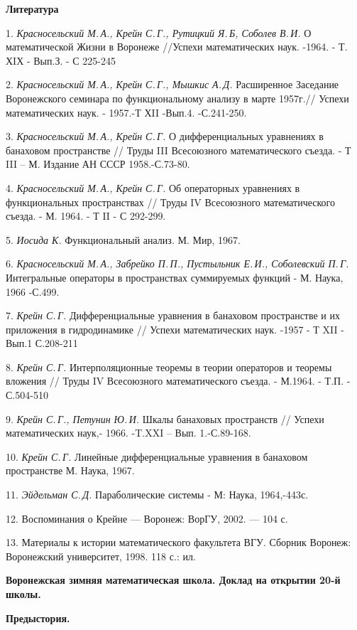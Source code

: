 \smallskip \centerline{\bf Литература}\nopagebreak

1. {\it Красносельский М.\,А., Крейн С.\,Г., Рутицкий Я.\,Б, Соболев В.\,И.} О математической Жизни в Воронеже //Успехи математических наук. -1964. - Т. ХIХ - Вып.З. - С 225-245

2.	{\it Красносельский М.\,А., Крейн С.\,Г., Мышкис А.\,Д.} Расширенное Заседание Воронежского семинара по функциональному анализу в марте 1957г.// Успехи математических наук. - 1957.-Т ХII -Вып.4. -С.241-250.

3. {\it Красносельский М.\,А., Крейн С.\,Г.}
О дифференциальных уравнениях в банаховом пространстве // Труды III Всесоюзного математического съезда. - Т III – М.  Издание АН СССР 1958.-С.73-80.

4. {\it Красносельский М.\,А., Крейн С.\,Г.}
Об операторных уравнениях в функциональных пространствах // Труды IV Всесоюзного математического съезда. - М. 1964. - Т II - С 292-299.

5.	{\it Иосида К.} Функциональный анализ. М. Мир, 1967.

6.	{\it Красносельский М.\,А., Забрейко П.\,П., Пустыльник Е.\,И., Соболевский П.\,Г.}
Интегральные операторы в пространствах суммируемых функций - М. Наука, 1966 -С.499.

7. {\it Крейн С.\,Г.}
Дифференциальные уравнения в банаховом пространстве и их приложения в гидродинамике // Ус\-пе\-хи математических наук. -1957 - Т XII - Вып.1 С.208-211

8.	{\it Крейн С.\,Г.} Интерполяционные теоремы в теории операторов и теоремы вложения // Труды IV Всесоюзного математического съезда. - М.1964. - Т.П. - С.504-510

9.	{\it Крейн С.\,Г., Петунин Ю.\,И.} Шкалы банаховых пространств // Успехи математических наук,- 1966. -T.XXI – Вып. 1.-С.89-168.

10.	{\it Крейн С.\,Г.} Линейные дифференциальные уравнения в банаховом пространстве М. Наука, 1967.

11.	{\it Эйдельман С.\,Д.} Параболические системы - М: Наука, 1964,-443с.

12. Воспоминания о Крейне — Воронеж: ВорГУ, 2002. — 104 с.

13.	 Материалы к истории математического факультета ВГУ. Сборник  Воронеж:
Воронежский университет, 1998. 118 с.: ил.

{\bf Воронежская зимняя математическая школа. Доклад на открытии 20-й школы.}

{\bf Предыстория.}


